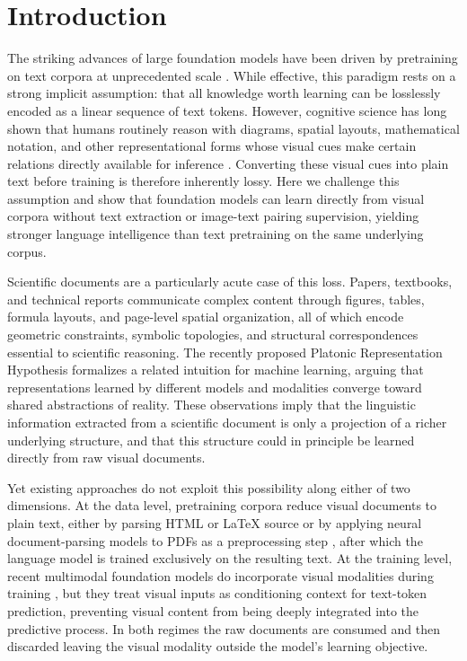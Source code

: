 \section{Introduction}
The striking advances of large foundation models have been driven by pretraining on 
text corpora at unprecedented scale \citep{brown2020language, kaplan2020scaling, hoffmann2022training}.
While effective, this paradigm rests on a strong implicit assumption: 
that all knowledge worth learning can be losslessly encoded as a linear sequence of text tokens.
However, cognitive science has long shown that humans routinely reason with
diagrams, spatial layouts, mathematical notation, and other representational
forms whose visual cues make certain relations directly available for
inference \citep{larkin1987diagram,zhang1997external,barsalou1999perceptual,barsalou2008grounded}.
Converting these visual cues into plain text before training is therefore inherently lossy.
Here we challenge this assumption and show that foundation models can 
learn directly from visual corpora without text extraction or image-text pairing supervision, 
yielding stronger language intelligence than text pretraining on the same underlying corpus.

Scientific documents are a particularly acute case of this loss.
Papers, textbooks, and technical reports communicate complex content through figures,
tables, formula layouts, and page-level spatial organization, all of which encode
geometric constraints, symbolic topologies, and structural correspondences essential
to scientific reasoning.
The recently proposed Platonic Representation Hypothesis \citep{huh2024platonic}
formalizes a related intuition for machine learning, arguing that representations learned
by different models and modalities converge toward shared abstractions of reality.
These observations imply that the linguistic information
extracted from a scientific document is only a projection of a richer underlying
structure, and that this structure could in principle be learned directly from raw
visual documents.

Yet existing approaches do not exploit this possibility along either of two dimensions.
At the data level, pretraining corpora reduce visual documents to plain text,
either by parsing HTML or LaTeX source \citep{paster2024openwebmath, gao2020pile}
or by applying neural document-parsing models to PDFs as a preprocessing step
\citep{blecher2024nougat, lee2023pix2struct, kim2021donut, wang2024mineru}, after
which the language model is trained exclusively on the resulting text.
At the training level, recent multimodal foundation models do incorporate visual modalities during training \citep{wang2024qwen2, chen2024internvl, liu2023visual},
but they treat visual inputs as conditioning context for text-token prediction, 
preventing visual content from being deeply integrated into the predictive process.
In both regimes the raw documents are consumed and then discarded leaving the visual modality outside the model's learning objective.

